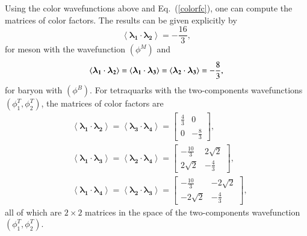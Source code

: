\documentclass[12pt,prd,onecolumn,floatfix,nofootinbib]{revtex4}
\begin{document}
Using the color wavefunctions above and Eq.~(\ref{colorfc}), one can compute
the matrices of color factors. The results can be given explicitly by
\begin{equation}
\left\langle \boldsymbol{\lambda _{1}}\cdot \boldsymbol{\lambda _{2}}%
\right\rangle =-\frac{16}{3},  \label{cfcM}
\end{equation}%
for meson with the wavefunction $(\phi ^{M})$ and
\begin{equation}
\left\langle \boldsymbol{\lambda _{1}}\cdot \boldsymbol{\lambda _{2}}%
\right\rangle =\left\langle \boldsymbol{\lambda _{1}}\cdot \boldsymbol{%
\lambda _{3}}\right\rangle =\left\langle \boldsymbol{\lambda _{2}}\cdot
\boldsymbol{\lambda _{3}}\right\rangle =-\frac{8}{3},  \label{cfcB}
\end{equation}%
for baryon with $(\phi ^{B})$. For tetraquarks with the two-components
wavefunctions $(\phi _{1}^{T},\phi _{2}^{T})$, the matrices of color factors
are
\begin{equation}
\begin{aligned} &\left\langle \boldsymbol{\lambda_{1}}\cdot
\boldsymbol{\lambda_{2}} \right\rangle= \left\langle
\boldsymbol{\lambda_{3}}\cdot \boldsymbol{\lambda_{4}} \right\rangle=
\begin{bmatrix} \frac{4}{3} & 0 \\ 0 & -\frac{8}{3} \end{bmatrix}, \\
&\left\langle \boldsymbol{\lambda_{1}}\cdot \boldsymbol{\lambda_{3}}
\right\rangle= \left\langle \boldsymbol{\lambda_{2}}\cdot
\boldsymbol{\lambda_{4}} \right\rangle= \begin{bmatrix} -\frac{10}{3} &
2\sqrt{2} \\ 2\sqrt{2} & -\frac{4}{3} \end{bmatrix}, \\ &\left\langle
\boldsymbol{\lambda_{1}}\cdot \boldsymbol{\lambda_{4}} \right\rangle=
\left\langle \boldsymbol{\lambda_{2}}\cdot \boldsymbol{\lambda_{3}}
\right\rangle= \begin{bmatrix} -\frac{10}{3} & -2\sqrt{2} \\ -2\sqrt{2} &
-\frac{4}{3} \end{bmatrix}, \end{aligned}  \label{cfcT}
\end{equation}%
all of which are $2\times 2$ matrices in the space of the two-components
wavefunction $(\phi _{1}^{T},\phi _{2}^{T})$.

\medskip
\end{document}
